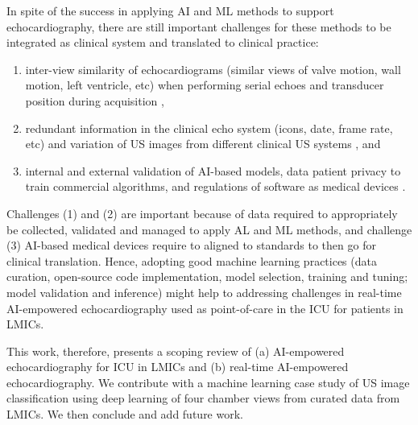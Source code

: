 \documentclass[mlabstract,twocolumn]{jmlr}
\begin{document}
In spite of the success in applying AI and ML methods to support echocardiography, there are still important challenges for these methods to be integrated as clinical system and translated to clinical practice:
\begin{enumerate}
\setlength\itemsep{0em}
\item inter-view similarity of echocardiograms (similar views of valve motion, wall motion, left ventricle, etc) when performing serial echoes and transducer position during acquisition \citep{zhang2018},
\item redundant information in the clinical echo system (icons, date, frame rate, etc) \citep{khamis2017} and variation of US images from different clinical US systems \citep{brindise2020unsupervised}, and
\item internal and external validation of AI-based models, data patient privacy to train commercial algorithms, and regulations of software as medical devices \citep{2022_Stewart_Emergency_Medicine_Australasia}.
\end{enumerate}
Challenges (1) and (2) are important because of data required to appropriately be collected, validated and managed to apply AL and ML methods, and challenge (3) AI-based medical devices require to aligned to standards to then go for clinical translation.
Hence, adopting good machine learning practices (data curation, open-source code implementation, model selection, training and tuning; model validation and inference) might help to addressing challenges in real-time AI-empowered echocardiography used as point-of-care in the ICU for patients in LMICs.

This work, therefore, presents a scoping review of (a) AI-empowered echocardiography for ICU in LMICs and (b) real-time AI-empowered echocardiography.
We contribute with a machine learning case study of US image classification using deep learning of four chamber views from curated data from LMICs.
We then conclude and add future work.
\end{document}
